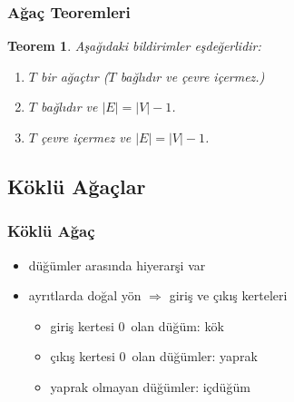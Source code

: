 \documentclass[dvipsnames]{beamer}
\theoremstyle{definition}
\theoremstyle{example}
\theoremstyle{plain}
\newtheorem{teorem}[theorem]{Teorem}
\begin{document}
%
%
%

\begin{frame}[label=theoremset2]
  \frametitle{Ağaç Teoremleri}

  \begin{teorem}
    Aşağıdaki bildirimler eşdeğerlidir:

    \begin{enumerate}
      \item $T$ bir ağaçtır ($T$ bağlıdır ve çevre içermez.)
      \item $T$ bağlıdır ve $|E| = |V| - 1$.
      \item $T$ çevre içermez ve $|E| = |V| - 1$.
    \end{enumerate}
  \end{teorem}
\end{frame}

\subsection{Köklü Ağaçlar}

\begin{frame}
  \frametitle{Köklü Ağaç}

  \begin{itemize}
    \item düğümler arasında hiyerarşi var

    \pause
    \item ayrıtlarda doğal yön $\Rightarrow$ giriş ve çıkış kerteleri
    \begin{itemize}
      \item giriş kertesi 0~olan düğüm: \alert{kök}
      \item çıkış kertesi 0~olan düğümler: \alert{yaprak}
      \item yaprak olmayan düğümler: \alert{içdüğüm}
    \end{itemize}
  \end{itemize}
\end{frame}
\end{document}
